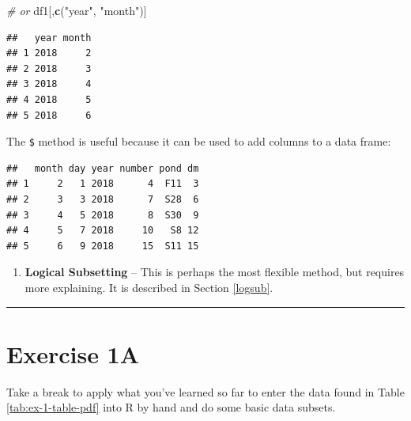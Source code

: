 \documentclass[]{book}
\newenvironment{Shaded}{\begin{snugshade}}{\end{snugshade}}
\newcommand{\CommentTok}[1]{\textcolor[rgb]{0.56,0.35,0.01}{\textit{#1}}}
\newcommand{\KeywordTok}[1]{\textcolor[rgb]{0.13,0.29,0.53}{\textbf{#1}}}
\newcommand{\NormalTok}[1]{#1}
\newcommand{\OperatorTok}[1]{\textcolor[rgb]{0.81,0.36,0.00}{\textbf{#1}}}
\newcommand{\StringTok}[1]{\textcolor[rgb]{0.31,0.60,0.02}{#1}}
\providecommand{\tightlist}{%
  \setlength{\itemsep}{0pt}\setlength{\parskip}{0pt}}
\begin{document}
\begin{Shaded}
\begin{Highlighting}[]
\CommentTok{# or}
\NormalTok{df1[,}\KeywordTok{c}\NormalTok{(}\StringTok{"year"}\NormalTok{, }\StringTok{"month"}\NormalTok{)]}
\end{Highlighting}
\end{Shaded}

\begin{verbatim}
##   year month
## 1 2018     2
## 2 2018     3
## 3 2018     4
## 4 2018     5
## 5 2018     6
\end{verbatim}

The \texttt{\$} method is useful because it can be used to add columns to a data frame:

\begin{Shaded}
\end{Shaded}

\begin{verbatim}
##   month day year number pond dm
## 1     2   1 2018      4  F11  3
## 2     3   3 2018      7  S28  6
## 3     4   5 2018      8  S30  9
## 4     5   7 2018     10   S8 12
## 5     6   9 2018     15  S11 15
\end{verbatim}

\begin{enumerate}
\def\labelenumi{\arabic{enumi}.}
\setcounter{enumi}{2}
\tightlist
\item
  \textbf{Logical Subsetting} -- This is perhaps the most flexible method, but requires more explaining. It is described in Section \ref{logsub}.
\end{enumerate}

\begin{center}\rule{0.5\linewidth}{\linethickness}\end{center}

\hypertarget{exercise-1a}{%
\section*{Exercise 1A}\label{exercise-1a}}

Take a break to apply what you've learned so far to enter the data found in Table \ref{tab:ex-1-table-pdf} into R by hand and do some basic data subsets.
\end{document}

